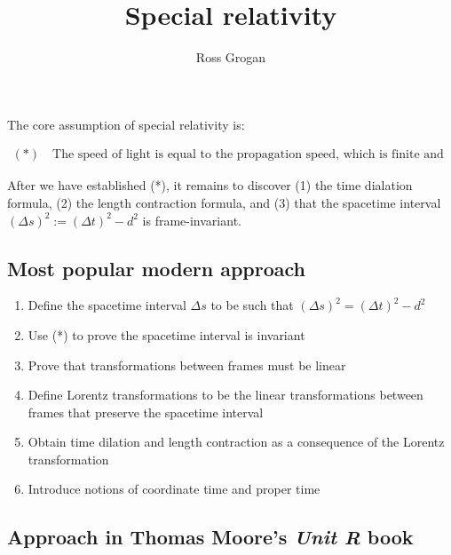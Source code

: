 \documentclass{article}
\title{Special relativity}
\author{Ross Grogan}
\date{}
\begin{document}
	
\maketitle

The core assumption of special relativity is:

\begin{align*}
	(*) \quad \text{The speed of light is equal to the propagation speed, which is finite and independent of reference frame.}
\end{align*}

After we have established (*), it remains to discover (1) the time dialation formula, (2) the length contraction formula, and (3) that the spacetime interval $(\Delta s)^2 := (\Delta t)^2 - d^2$ is frame-invariant.

\subsection*{Most popular modern approach}

\begin{enumerate}
	\item Define the spacetime interval $\Delta s$ to be such that $(\Delta s)^2 = (\Delta t)^2 - d^2$
	\item Use (*) to prove the spacetime interval is invariant
	\item Prove that transformations between frames must be linear 
	\item Define Lorentz transformations to be the linear transformations between frames that preserve the spacetime interval
	\item Obtain time dilation and length contraction as a consequence of the Lorentz transformation
	\item Introduce notions of coordinate time and proper time
\end{enumerate}

\subsection*{Approach in Thomas Moore's \textit{Unit R} book}
\end{document}
